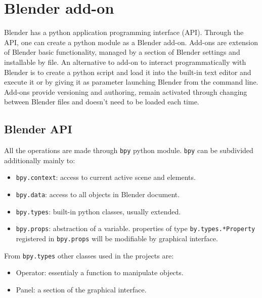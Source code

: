 \chapter{Blender add-on}
\label{chap:blender_add_on}

Blender has a python application programming interface (API). Through the API, one can create a python module as a Blender add-on. Add-ons are extension of Blender basic functionality, managed by a section of Blender settings and installable by file.
An alternative to add-on to interact programmatically with Blender is to create a python script and load it into the built-in text editor and execute it or by giving it as parameter launching Blender from the command line.
Add-ons provide versioning and authoring, remain activated through changing between Blender files and doesn't need to be loaded each time.

\section{Blender API}
All the operations are made through \texttt{bpy} python module.
\texttt{bpy} can be subdivided additionally mainly to:
\begin{itemize}
\item \texttt{bpy.context}: access to current active scene and elements.
\item \texttt{bpy.data}: access to all objects in Blender document.
\item \texttt{bpy.types}: built-in python classes, usually extended.
\item \texttt{bpy.props}: abstraction of a variable. properties of type \texttt{by.types.*Property} registered in \texttt{bpy.props} will be modifiable by graphical interface.
\end{itemize}
From \texttt{bpy.types} other classes used in the projects are:
\begin{itemize}
\item Operator: essentialy a function to manipulate objects.
\item Panel: a section of the graphical interface.
\end{itemize}

